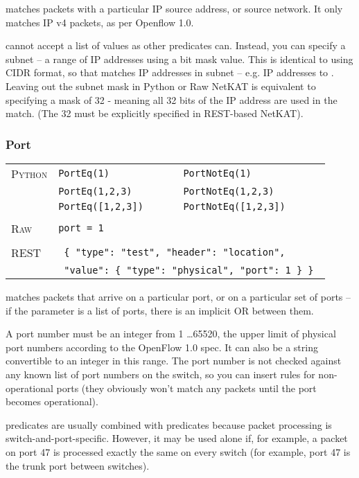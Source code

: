  matches packets with a particular IP source address, or source network.  It only matches
IP v4 packets, as per Openflow 1.0.  

 cannot accept a list of values as other predicates can.  
Instead, you can specify a subnet -- a range
of IP addresses using a bit mask value.  This is identical to using CIDR format, so that 
 matches IP addresses in subnet  -- e.g. 
IP addresses  to .  Leaving out the subnet mask in Python 
or Raw NetKAT is equivalent to specifying a mask of 32 - meaning all 32 bits of the IP address are used
in the match.  (The 32 must be explicitly specified in REST-based NetKAT).


\subsubsection{Port}

\bigskip
\begin{tabularx}{\linewidth}{lXX}
\textsc{Python} 	& \texttt{PortEq(1)} 		& \texttt{PortNotEq(1)} \\
	 	& \texttt{PortEq(1,2,3)} 	& \texttt{PortNotEq(1,2,3)} \\
	 	& \texttt{PortEq([1,2,3])} 	& \texttt{PortNotEq([1,2,3])} \\ \\
\textsc{Raw}		& \texttt{port = 1} 		& \\ \\
\textsc{REST}	& \multicolumn{2}{l}{\texttt{ \{ "type": "test", "header": "location", }}\\
 & \multicolumn{2}{l}{\texttt{ "value": \{ "type": "physical", "port": 1 \} \} }} 
\end{tabularx}

 matches packets that arrive on a particular port, or on a particular set of ports -- if the 
parameter is a list of ports, there is an implicit OR between them.  

A port number must be an integer from
1 \ldots 65520, the upper limit of physical port numbers according to the OpenFlow 1.0 spec.  It can also be 
a string convertible to an integer in this range.  The port number is not checked against any known list
of port numbers on the switch, so you can insert rules for non-operational ports (they obviously won't
match any packets until the port becomes operational).  

 predicates are usually combined with  predicates because packet processing
is switch-and-port-specific.  However, it may be used alone if, for example, a packet on port 47 is processed exactly
the same on every switch (for example, port 47 is the trunk port between switches).  

